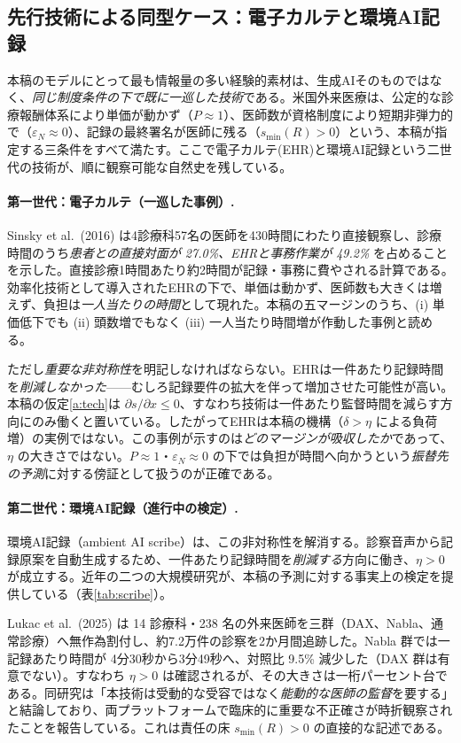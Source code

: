 \documentclass[11pt]{article}
\theoremstyle{plain}
\theoremstyle{definition}
\theoremstyle{remark}
\begin{document}
\subsection{先行技術による同型ケース：電子カルテと環境AI記録}\label{sec:ehr}
本稿のモデルにとって最も情報量の多い経験的素材は、生成AIそのものではなく、\emph{同じ制度条件の下で既に一巡した技術}である。米国外来医療は、公定的な診療報酬体系により単価が動かず（$P\approx1$）、医師数が資格制度により短期非弾力的で（$\varepsilon_N\approx0$）、記録の最終署名が医師に残る（$s_{\min}(R)>0$）という、本稿が指定する三条件をすべて満たす。ここで電子カルテ(EHR)と環境AI記録という二世代の技術が、順に観察可能な自然史を残している。

\paragraph{第一世代：電子カルテ（一巡した事例）.}
Sinsky et al.\ (2016) は4診療科57名の医師を430時間にわたり直接観察し、診療時間のうち\emph{患者との直接対面が 27.0\%、EHRと事務作業が 49.2\%} を占めることを示した。直接診療1時間あたり約2時間が記録・事務に費やされる計算である。効率化技術として導入されたEHRの下で、単価は動かず、医師数も大きくは増えず、負担は\emph{一人当たりの時間}として現れた。本稿の五マージンのうち、(i) 単価低下でも (ii) 頭数増でもなく (iii) 一人当たり時間増が作動した事例と読める。

ただし\emph{重要な非対称性}を明記しなければならない。EHRは一件あたり記録時間を\emph{削減しなかった}——むしろ記録要件の拡大を伴って増加させた可能性が高い。本稿の仮定\ref{a:tech}は $\partial s/\partial x\le0$、すなわち技術は一件あたり監督時間を減らす方向にのみ働くと置いている。したがってEHRは本稿の機構（$\delta>\eta$ による負荷増）の実例ではない。この事例が示すのは\emph{どのマージンが吸収したか}であって、$\eta$ の大きさではない。$P\approx1$・$\varepsilon_N\approx0$ の下では負担が時間へ向かうという\emph{振替先の予測}に対する傍証として扱うのが正確である。

\paragraph{第二世代：環境AI記録（進行中の検定）.}
環境AI記録（ambient AI scribe）は、この非対称性を解消する。診察音声から記録原案を自動生成するため、一件あたり記録時間を\emph{削減する}方向に働き、$\eta>0$ が成立する。近年の二つの大規模研究が、本稿の予測に対する事実上の検定を提供している（表\ref{tab:scribe}）。

Lukac et al.\ (2025) は 14 診療科・238 名の外来医師を三群（DAX、Nabla、通常診療）へ無作為割付し、約7.2万件の診察を2か月間追跡した。Nabla 群では一記録あたり時間が 4分30秒から3分49秒へ、対照比 9.5\% 減少した（DAX 群は有意でない）。すなわち $\eta>0$ は確認されるが、その大きさは一桁パーセント台である。同研究は「本技術は受動的な受容ではなく\emph{能動的な医師の監督}を要する」と結論しており、両プラットフォームで臨床的に重要な不正確さが時折観察されたことを報告している。これは責任の床 $s_{\min}(R)>0$ の直接的な記述である。
\end{document}
